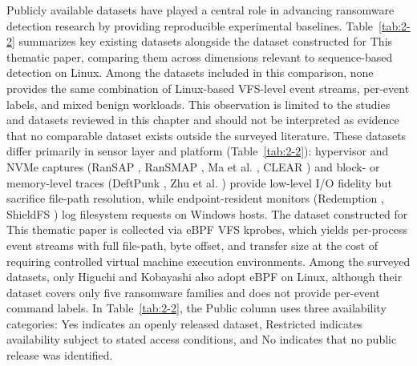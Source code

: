 Publicly available datasets have played a central role in advancing ransomware detection research by providing reproducible experimental baselines. Table~\ref{tab:2-2} summarizes key existing datasets alongside the dataset constructed for This thematic paper, comparing them across dimensions relevant to sequence-based detection on Linux. Among the datasets included in this comparison, none provides the same combination of Linux-based VFS-level event streams, per-event labels, and mixed benign workloads. This observation is limited to the studies and datasets reviewed in this chapter and should not be interpreted as evidence that no comparable dataset exists outside the surveyed literature. These datasets differ primarily in sensor layer and platform (Table~\ref{tab:2-2}): hypervisor and NVMe captures (RanSAP \cite{ref22}, RanSMAP \cite{ref23}, Ma et al. \cite{ref36}, CLEAR \cite{ref9}) and block- or memory-level traces (DeftPunk \cite{ref34}, Zhu et al. \cite{ref35}) provide low-level I/\allowbreak{}O fidelity but sacrifice file-path resolution, while endpoint-resident monitors (Redemption \cite{ref38}, ShieldFS \cite{ref39}) log filesystem requests on Windows hosts. The dataset constructed for This thematic paper is collected via eBPF VFS kprobes, which yields per-process event streams with full file-path, byte offset, and transfer size at the cost of requiring controlled virtual machine execution environments. Among the surveyed datasets, only Higuchi and Kobayashi \cite{ref37} also adopt eBPF on Linux, although their dataset covers only five ransomware families and does not provide per-event command labels. In Table~\ref{tab:2-2}, the Public column uses three availability categories: Yes indicates an openly released dataset, Restricted indicates availability subject to stated access conditions, and No indicates that no public release was identified.

